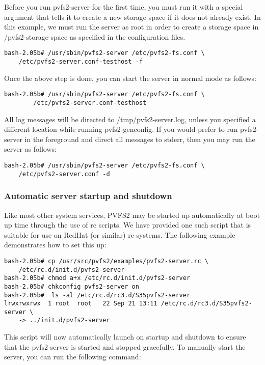 \documentclass[11pt, letterpaper]{article}
\begin{document}
Before you run pvfs2-server for the first time, you must run it with a special 
argument that tells it to create a new storage space if it does not already 
exist.  In this example, we must run the server as root in order to create
a storage space in /pvfs2-storage-space as specified in the configuration
files.

\begin{verbatim}
bash-2.05b# /usr/sbin/pvfs2-server /etc/pvfs2-fs.conf \
	/etc/pvfs2-server.conf-testhost -f
\end{verbatim}

Once the above step is done, you can start the server in normal mode 
as follows:

\begin{verbatim}
bash-2.05b# /usr/sbin/pvfs2-server /etc/pvfs2-fs.conf \
		/etc/pvfs2-server.conf-testhost
\end{verbatim}

All log messages will be directed to /tmp/pvfs2-server.log, unless you specified
a different location while running pvfs2-genconfig.  If you would prefer to run 
pvfs2-server in the foreground and direct all messages to stderr, then 
you may run the server as follows:

\begin{verbatim}
bash-2.05b# /usr/sbin/pvfs2-server /etc/pvfs2-fs.conf \
	/etc/pvfs2-server.conf -d
\end{verbatim}

\subsubsection{Automatic server startup and shutdown}
\label{sec:rc}

Like most other system services, PVFS2 may be started up automatically at 
boot up time through the use of rc scripts.  We have provided one such
script that is suitable for use on RedHat (or similar) rc systems.  The 
following example demonstrates how to set this up:

\begin{verbatim}
bash-2.05b# cp /usr/src/pvfs2/examples/pvfs2-server.rc \
    /etc/rc.d/init.d/pvfs2-server
bash-2.05b# chmod a+x /etc/rc.d/init.d/pvfs2-server
bash-2.05b# chkconfig pvfs2-server on
bash-2.05b#  ls -al /etc/rc.d/rc3.d/S35pvfs2-server 
lrwxrwxrwx  1 root  root   22 Sep 21 13:11 /etc/rc.d/rc3.d/S35pvfs2-server \
    -> ../init.d/pvfs2-server
\end{verbatim}

This script will now automatically launch on startup and shutdown to 
ensure that the pvfs2-server is started and stopped gracefully.
To manually start the server, you can run the following command:
\end{document}
